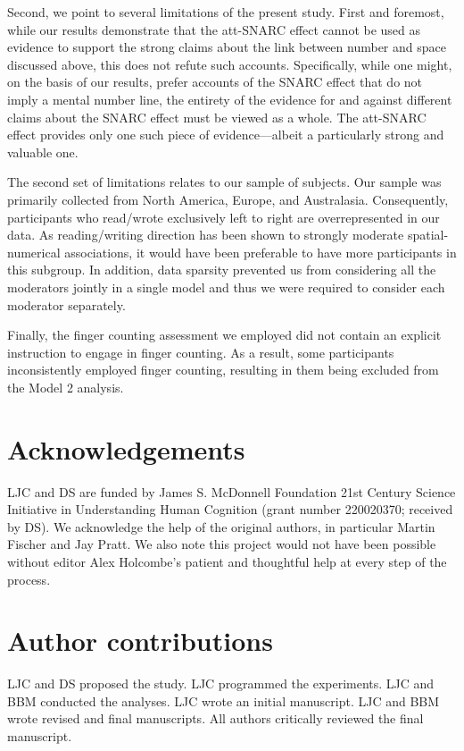 \documentclass[A4paper,man,floatsintext]{apa6}
\theoremstyle{definition}
\theoremstyle{definition}
\theoremstyle{definition}
\theoremstyle{remark}
\begin{document}
Second, we point to several limitations of the present study. First and
foremost, while our results demonstrate that the att-SNARC effect cannot
be used as evidence to support the strong claims about the link between
number and space discussed above, this does not refute such accounts.
Specifically, while one might, on the basis of our results, prefer
accounts of the SNARC effect that do not imply a mental number line, the
entirety of the evidence for and against different claims about the
SNARC effect must be viewed as a whole. The att-SNARC effect provides
only one such piece of evidence---albeit a particularly strong and
valuable one.

The second set of limitations relates to our sample of subjects. Our
sample was primarily collected from North America, Europe, and
Australasia. Consequently, participants who read/wrote exclusively left
to right are overrepresented in our data. As reading/writing direction
has been shown to strongly moderate spatial-numerical associations, it
would have been preferable to have more participants in this subgroup.
In addition, data sparsity prevented us from considering all the
moderators jointly in a single model and thus we were required to
consider each moderator separately.

Finally, the finger counting assessment we employed did not contain an
explicit instruction to engage in finger counting. As a result, some
participants inconsistently employed finger counting, resulting in them
being excluded from the Model 2 analysis.

\section{Acknowledgements}\label{acknowledgements}

LJC and DS are funded by James S. McDonnell Foundation 21st Century
Science Initiative in Understanding Human Cognition (grant number
220020370; received by DS). We acknowledge the help of the original
authors, in particular Martin Fischer and Jay Pratt. We also note this
project would not have been possible without editor Alex Holcombe's
patient and thoughtful help at every step of the process.

\section{Author contributions}\label{author-contributions}

LJC and DS proposed the study. LJC programmed the experiments. LJC and
BBM conducted the analyses. LJC wrote an initial manuscript. LJC and BBM
wrote revised and final manuscripts. All authors critically reviewed the
final manuscript.
\end{document}
